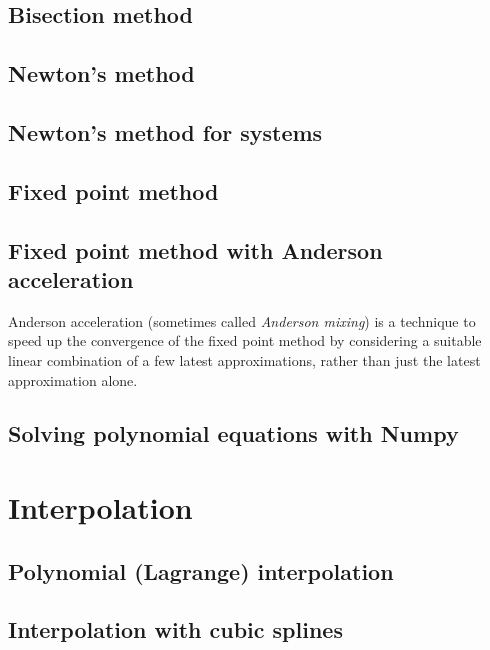 \documentclass[article,A4,12pt]{llncs}
\begin{document}
\subsection{Bisection method}



\subsection{Newton's method}


\subsection{Newton's method for systems}


\subsection{Fixed point method}


\subsection{Fixed point method with Anderson acceleration}

Anderson acceleration (sometimes called {\em Anderson mixing}) is a technique
to speed up the convergence of the fixed point method by considering 
a suitable linear combination of a few latest approximations, rather than 
just the latest approximation alone. 





\subsection{Solving polynomial equations with Numpy}





\section{Interpolation}





\subsection{Polynomial (Lagrange) interpolation}




\subsection{Interpolation with cubic splines}
\end{document}
